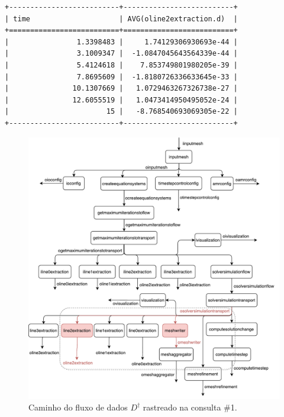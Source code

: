 \begin{center}
\begin{lstlisting}[language=sqlresults,label={lst:experiments-1-sqlresults},caption={[Resultados da consulta \#1.]Resultados da consulta \#1 (7 tuplas, tempo médio: 4,35~ms).}]
+--------------------------+--------------------------+
| time                     | AVG(oline2extraction.d)  |
+==========================+==========================+
|                1.3398483 |     1.74129306930693e-44 |
|                3.1009347 |  -1.0847045643564339e-44 |
|                5.4124618 |    7.853749801980205e-39 |
|                7.8695609 |  -1.8180726336633645e-33 |
|               10.1307669 |   1.0729463267326738e-27 |
|               12.6055519 |   1.0473414950495052e-24 |
|                       15 |   -8.768540693069305e-22 |
+--------------------------+--------------------------+
\end{lstlisting}
\end{center}

\begin{figure}[htb]
    \centering
    \includegraphics[width=\textwidth]{img/experiments-dataflow-1}
    \caption[Caminho do fluxo de dados \(D^{\dagger}\) rastreado na consulta \#1]{Caminho do fluxo de dados \(D^{\dagger}\) rastreado na consulta \#1.}%
    \label{fig:experiments-dataflow-1}
\end{figure}


